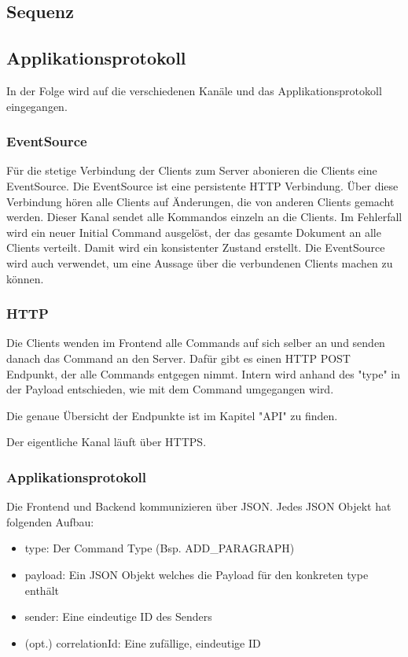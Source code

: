 \subsection{Sequenz}

\subsection{Applikationsprotokoll}
In der Folge wird auf die verschiedenen Kanäle und das Applikationsprotokoll eingegangen.

\subsubsection{EventSource}
Für die stetige Verbindung der Clients zum Server abonieren die Clients eine EventSource.
Die EventSource ist eine persistente HTTP Verbindung.
Über diese Verbindung hören alle Clients auf Änderungen, die von anderen Clients gemacht werden.
Dieser Kanal sendet alle Kommandos einzeln an die Clients.
Im Fehlerfall wird ein neuer Initial Command ausgelöst, der das gesamte Dokument an alle Clients verteilt.
Damit wird ein konsistenter Zustand erstellt.
Die EventSource wird auch verwendet, um eine Aussage über die verbundenen Clients machen zu können.

\subsubsection{HTTP}
Die Clients wenden im Frontend alle Commands auf sich selber an und senden danach das Command an den Server.
Dafür gibt es einen HTTP POST Endpunkt, der alle Commands entgegen nimmt.
Intern wird anhand des "type" in der Payload entschieden, wie mit dem Command umgegangen wird.

Die genaue Übersicht der Endpunkte ist im Kapitel "API" zu finden.

Der eigentliche Kanal läuft über HTTPS.

\subsubsection{Applikationsprotokoll}
Die Frontend und Backend kommunizieren über JSON.
Jedes JSON Objekt hat folgenden Aufbau:
\begin{itemize}
    \item type: Der Command Type (Bsp. ADD\_PARAGRAPH)
    \item payload: Ein JSON Objekt welches die Payload für den konkreten type enthält
    \item sender: Eine eindeutige ID des Senders
    \item (opt.) correlationId: Eine zufällige, eindeutige ID
\end{itemize}

